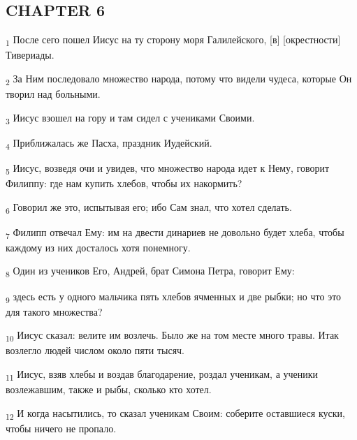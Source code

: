 \subsection{CHAPTER 6}
\begin{tcolorbox}
\textsubscript{1} После сего пошел Иисус на ту сторону моря Галилейского, [в] [окрестности] Тивериады.
\end{tcolorbox}
\begin{tcolorbox}
\textsubscript{2} За Ним последовало множество народа, потому что видели чудеса, которые Он творил над больными.
\end{tcolorbox}
\begin{tcolorbox}
\textsubscript{3} Иисус взошел на гору и там сидел с учениками Своими.
\end{tcolorbox}
\begin{tcolorbox}
\textsubscript{4} Приближалась же Пасха, праздник Иудейский.
\end{tcolorbox}
\begin{tcolorbox}
\textsubscript{5} Иисус, возведя очи и увидев, что множество народа идет к Нему, говорит Филиппу: где нам купить хлебов, чтобы их накормить?
\end{tcolorbox}
\begin{tcolorbox}
\textsubscript{6} Говорил же это, испытывая его; ибо Сам знал, что хотел сделать.
\end{tcolorbox}
\begin{tcolorbox}
\textsubscript{7} Филипп отвечал Ему: им на двести динариев не довольно будет хлеба, чтобы каждому из них досталось хотя понемногу.
\end{tcolorbox}
\begin{tcolorbox}
\textsubscript{8} Один из учеников Его, Андрей, брат Симона Петра, говорит Ему:
\end{tcolorbox}
\begin{tcolorbox}
\textsubscript{9} здесь есть у одного мальчика пять хлебов ячменных и две рыбки; но что это для такого множества?
\end{tcolorbox}
\begin{tcolorbox}
\textsubscript{10} Иисус сказал: велите им возлечь. Было же на том месте много травы. Итак возлегло людей числом около пяти тысяч.
\end{tcolorbox}
\begin{tcolorbox}
\textsubscript{11} Иисус, взяв хлебы и воздав благодарение, роздал ученикам, а ученики возлежавшим, также и рыбы, сколько кто хотел.
\end{tcolorbox}
\begin{tcolorbox}
\textsubscript{12} И когда насытились, то сказал ученикам Своим: соберите оставшиеся куски, чтобы ничего не пропало.
\end{tcolorbox}
